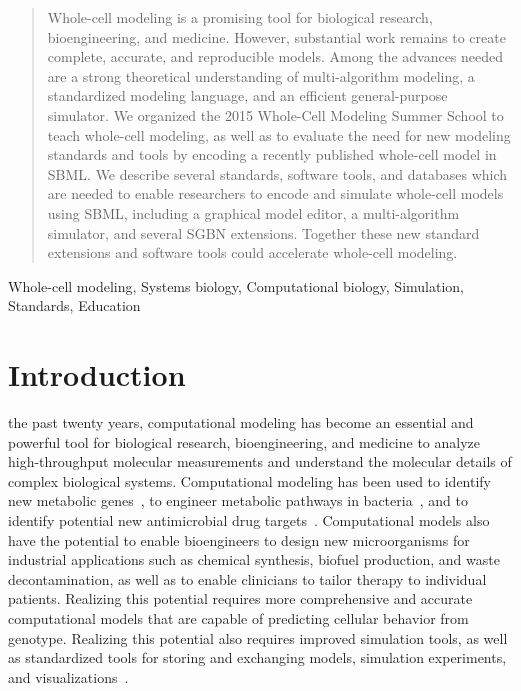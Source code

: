 \documentclass[journal,transmag]{IEEEtran}
\begin{document}
\maketitle

\begin{abstract}
Whole-cell modeling is a promising tool for biological research, bioengineering, and medicine. 
However, substantial work remains to create complete, accurate, and reproducible models.
Among the advances needed are a strong theoretical understanding of multi-algorithm modeling, a standardized modeling language, and an efficient general-purpose simulator.
We organized the 2015 Whole-Cell Modeling Summer School to teach whole-cell modeling, as well as to evaluate the need for new modeling standards and tools by encoding a recently published whole-cell model in SBML.
We describe several standards, software tools, and databases which are needed to enable researchers to encode and simulate whole-cell models using SBML, including a graphical model editor, a multi-algorithm simulator, and several SGBN extensions.
Together these new standard extensions and software tools could accelerate whole-cell modeling.
\end{abstract}

\begin{IEEEkeywords}
Whole-cell modeling, Systems biology, Computational biology, Simulation, Standards, Education
\end{IEEEkeywords}

\IEEEpeerreviewmaketitle

\section{Introduction}

 the past twenty years, computational modeling has become an essential and powerful tool for biological research, bioengineering, and medicine to analyze high-throughput molecular measurements and understand the molecular details of complex biological systems. Computational modeling has been used to identify new metabolic genes~\cite{Reed2006}, to engineer metabolic pathways in bacteria~\cite{Lee2012}, and to identify potential new antimicrobial drug targets~\cite{Lee2009}.
Computational models also have the potential to enable bioengineers to design new microorganisms for industrial applications such as chemical synthesis, biofuel production, and waste decontamination, as well as to enable clinicians to tailor therapy to individual patients. Realizing this potential requires more comprehensive and accurate computational models that are capable of predicting cellular behavior from genotype. Realizing this potential also requires improved simulation tools, as well as standardized tools for storing and exchanging models, simulation experiments, and visualizations~\cite{Macklin2014,Karr2015,Karr2015b,hucka2015promoting,Klipp07,path2models2013}.
\end{document}
